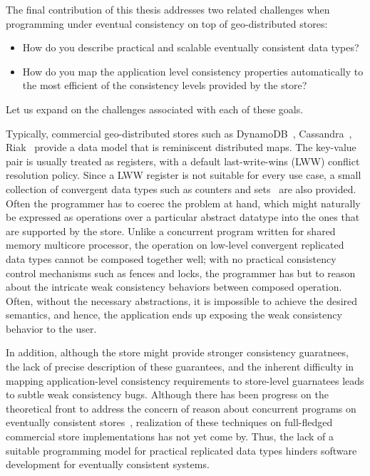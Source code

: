 The final contribution of this thesis addresses two related challenges when
programming under eventual consistency on top of geo-distributed stores:

\begin{itemize}
\item How do you describe practical and scalable eventually consistent data types?
\item How do you map the application level consistency properties automatically
to the most efficient of the consistency levels provided by the store?
\end{itemize}

Let us expand on the challenges associated with each of these goals.

Typically, commercial geo-distributed stores such as DynamoDB~\cite{DynamoDB},
Cassandra~\cite{Lakshman2010}, Riak~\cite{Riak} provide a data model that is
reminiscent distributed maps. The key-value pair is usually treated as
registers, with a default last-write-wins (LWW) conflict resolution policy.
Since a LWW register is not suitable for every use case, a small collection of
convergent data types such as counters and sets~\cite{SSS} are also provided.
Often the programmer has to coerec the problem at hand, which might naturally
be expressed as operations over a particular abstract datatype into the ones
that are supported by the store. Unlike a concurrent program written for shared
memory multicore processor, the operation on low-level convergent replicated
data types cannot be composed together well; with no practical consistency
control mechanisms such as fences and locks, the programmer has but to reason
about the intricate weak consistency behaviors between composed operation.
Often, without the necessary abstractions, it is impossible to achieve the
desired semantics, and hence, the application ends up exposing the weak
consistency behavior to the user.

In addition, although the store might provide stronger consistency guaratnees,
the lack of precise description of these guarantees, and the inherent
difficulty in mapping application-level consistency requirements to store-level
guarnatees leads to subtle weak consistency bugs. Although there has been
progress on the theoretical front to address the concern of reason about
concurrent programs on eventually consistent stores~\cite{Burckhardt2014},
realization of these techniques on full-fledged commercial store
implementations has not yet come by. Thus, the lack of a suitable programming
model for practical replicated data types hinders software development for
eventually consistent systems.

